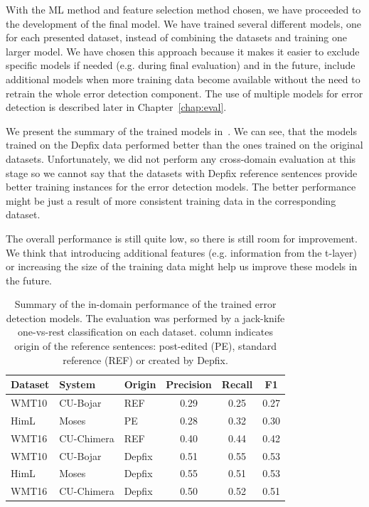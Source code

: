 With the ML method and feature selection method chosen, we have proceeded to 
the development of the final model.
We have trained several different models, one for each presented dataset, instead of combining
the datasets and training one larger model. We have chosen this approach because it makes
it easier to exclude specific models if needed (e.g. during final evaluation) and in the
future, include additional models when more training data become available without the need
to retrain the whole error detection component. The use of multiple models for error detection
is described later in Chapter~\ref{chap:eval}.

We present the summary of the trained models in~. We can see, that the models
trained on the Depfix data performed better than the ones trained on the original datasets.
Unfortunately, we did not perform any cross-domain evaluation at this stage so we cannot say
that the datasets with Depfix reference sentences provide better training instances for the
error detection models. The better performance might be just a result of more consistent
training data in the corresponding dataset.

The overall
performance is still quite low, so there is still room for improvement. We think that introducing
additional features (e.g. information from the t-layer) or increasing the size of the training data
might help us improve these models in the future.

\begin{table}[t]
\centering
\small

\begin{tabular}{lll|ccc}
Dataset  &  System  &  Origin  &  Precision  &  Recall  &  F1  \\
\hline
WMT10  &   CU-Bojar  &  REF  &  0.29  &  0.25  &  0.27  \\
HimL  &  Moses  &  PE  &  0.28  &  0.32  &  0.30  \\
WMT16  &  CU-Chimera  &  REF  &  0.40  &  0.44  &  0.42  \\
WMT10  &  CU-Bojar  &  Depfix  &  0.51  &  0.55  &  0.53  \\
HimL  &  Moses  &  Depfix  &  0.55  &  0.51  &  0.53  \\
WMT16  &  CU-Chimera  &  Depfix  &  0.50  &  0.52  &  0.51  \\
\end{tabular}
\caption[Model summary (Czech) - error detection]{
    Summary of the in-domain performance of the trained error detection models. The evaluation was performed
by a jack-knife one-vs-rest classification on each dataset.  column indicates origin
of the reference sentences: post-edited (PE), standard reference (REF) or created by Depfix.
}
\label{wf-summary}
\end{table}


